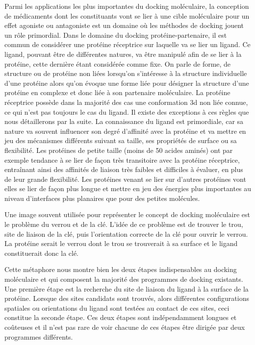 Parmi les applications les plus importantes du docking moléculaire, la conception de médicaments dont les constituants vont se lier à une cible moléculaire pour un effet agoniste ou antagoniste est un domaine où les méthodes de docking jouent un rôle primordial.
Dans le domaine du docking protéine-partenaire, il est commun de considérer une protéine réceptrice sur laquelle va se lier un ligand. Ce ligand, pouvant être de différentes natures, va être manipulé afin de se lier à la protéine, cette dernière étant considérée comme fixe. On parle de forme, de structure ou de protéine non liées lorsqu'on s'intéresse à la structure individuelle d'une protéine alors qu'on évoque une forme liée pour désigner la structure d'une protéine en complexe et donc liée à son partenaire moléculaire. 
La protéine réceptrice possède dans la majorité des cas une conformation 3d non liée connue, ce qui n'est pas toujours le cas du ligand. Il existe des exceptions à ces règles que nous détaillerons par la suite. La connaissance du ligand est primordiale, car sa nature va souvent influencer son degré d'affinité avec la protéine et va mettre en jeu des mécanismes différents suivant sa taille, ses propriétés de surface ou sa flexibilité. Les protéines de petite taille (moins de 50 acides aminés) ont par exemple tendance à se lier de façon très transitoire avec la protéine réceptrice, entraînant ainsi des affinités de liaison très faibles et difficiles à évaluer, en plus de leur grande flexibilité. Les protéines venant se lier sur d'autres protéines vont elles se lier de façon plus longue et mettre en jeu des énergies plus importantes au niveau d'interfaces plus planaires que pour des petites molécules.

Une image souvent utilisée pour représenter le concept de docking moléculaire est le problème du verrou et de la clé. L'idée de ce problème est de trouver le trou, site de liaison de la clé, puis l'orientation correcte de la clé pour ouvrir le verrou. La protéine serait le verrou dont le trou se trouverait à sa surface et le ligand constituerait donc la clé.

Cette métaphore nous montre bien les deux étapes indispensables au docking moléculaire et qui composent la majorité des programmes de docking existants. Une première étape est la recherche du site de liaison du ligand à la surface de la protéine. Lorsque des sites candidats sont trouvés, alors différentes configurations spatiales ou orientations du ligand sont testées au contact de ces sites, ceci constitue la seconde étape. Ces deux étapes sont indépendamment longues et coûteuses et il n'est pas rare de voir chacune de ces étapes être dirigée par deux programmes différents.

